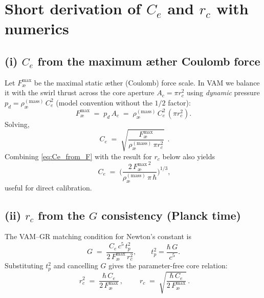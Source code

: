 \documentclass[12pt]{article}
\newcommand{\aeRhoM}{\rho_{\text{\ae}}^{(\text{mass})}}
\newcommand{\Ce}{C_e}
\newcommand{\rc}{r_c}
\begin{document}
    \section{Short derivation of \texorpdfstring{\(\Ce\)}{Ce} and \texorpdfstring{\(\rc\)}{rc} with numerics}
    \subsection*{(i) \(\Ce\) from the maximum æther Coulomb force}
    Let \(F_{\text{\ae}}^{\max}\) be the maximal static æther (Coulomb) force scale. In VAM we balance it with the swirl thrust across the core aperture \(A_c=\pi \rc^2\) using \emph{dynamic} pressure \(p_d=\aeRhoM\,\Ce^2\) (model convention without the \(1/2\) factor):
    \begin{equation}
        F_{\text{\ae}}^{\max} \;=\; p_d\,A_c \;=\; \aeRhoM\,\Ce^2\,(\pi \rc^2).
    \end{equation}
    Solving,
    \begin{equation}
        \boxed{\;\Ce \;=\; \sqrt{\frac{F_{\text{\ae}}^{\max}}{\aeRhoM\,\pi \rc^2}}\;}\,.
        \label{eq:Ce_from_F}
    \end{equation}
    Combining \eqref{eq:Ce_from_F} with the result for \(\rc\) below also yields
    \begin{equation}
        \boxed{\;\Ce \;=\;\Big(\frac{2\,{F_{\text{\ae}}^{\max}}^{\,2}}{\aeRhoM\,\pi\,\hbar}\Big)^{\!1/3}}\!,
    \end{equation}
    useful for direct calibration.

    \subsection*{(ii) \(\rc\) from the \(G\) consistency (Planck time)}
    The VAM--GR matching condition for Newton's constant is
    \begin{equation}
        G \;=\; \frac{\Ce\,c^5\,t_p^2}{2\,F_{\text{\ae}}^{\max}\,\rc^2},\qquad
        t_p^2=\frac{\hbar\,G}{c^5}.
    \end{equation}
    Substituting \(t_p^2\) and cancelling \(G\) gives the parameter-free core relation:
    \begin{equation}
        \boxed{\;\rc^2 \;=\; \frac{\hbar\,\Ce}{2\,F_{\text{\ae}}^{\max}}\,},\qquad
        \boxed{\;\rc \;=\; \sqrt{\frac{\hbar\,\Ce}{2\,F_{\text{\ae}}^{\max}}}\,}.
        \label{eq:rc_from_F}
    \end{equation}
\end{document}
